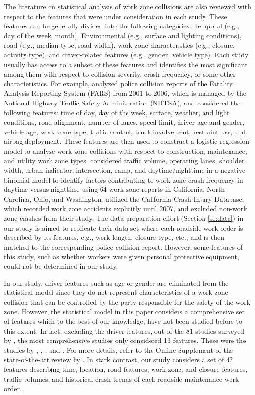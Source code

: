 \documentclass[10pt,a4paper]{article}
\begin{document}
The literature on statistical analysis of work zone collisions are also reviewed with respect to the features that were under consideration in each study. These features can be generally divided into the following categories: Temporal (e.g., day of the week, month), Environmental (e.g., surface and lighting conditions), road (e.g., median type, road width), work zone characteristics (e.g., closure, activity type), and driver-related features (e.g., gender, vehicle type). Each study usually has access to a subset of these features and identifies the most significant among them with respect to collision severity, crash frequency, or some other characteristics. For example, \cite{weng2011analysis} analyzed police collision reports of the Fatality  Analysis  Reporting  System (FARS) from 2001 to 2006, which is managed by the National Highway Traffic Safety Administration (NHTSA), and considered the following features: time of day, day of the week, surface, weather, and light conditions, road alignment, number of lanes, speed limit, driver age and gender, vehicle age, work zone type, traffic control, truck involvement, restraint use, and airbag deployment. These features are then used to construct a logistic regression model to analyze work zone collisions with respect to construction, maintenance, and utility work zone types. \cite{srinivasan2011use} considered traffic volume, operating lanes, shoulder width, urban indicator, intersection, ramp, and daytime/nighttime in a negative binomial model to identify factors contributing to work zone crash frequency in daytime versus nighttime using 64 work zone reports in California, North Carolina, Ohio, and Washington. \cite{wong2011factors} utilized the California Crash Injury Database, which recorded work zone accidents explicitly until 2007, and excluded non-work zone crashes from their study. The data preparation effort (Section \ref{se:data}) in our study is aimed to replicate their data set where each roadside work order is described by its features, e.g., work length, closure type, etc., and is then matched to the corresponding police collision report. However, some features of this study, such as whether workers were given personal protective equipment, could not be determined in our study.

In our study, driver features such as age or gender are eliminated from the statistical model since they do not represent characteristics of a work zone collision that can be controlled by the party responsible for the safety of the work zone. However, the statistical model in this paper considers a comprehensive set of features which to the best of our knowledge, have not been studied before to this extent. In fact, excluding the driver features, out of the 81 studies surveyed by \cite{yang2015work}, the most comprehensive studies only considered 13 features. These were the studies by \cite{li2008comparison}, \cite{li2008development}, \cite{li2009highway}, and \cite{elghamrawy2011optimizing}. For more details, refer to the Online Supplement of the state-of-the-art review by \cite{yang2015work}. In stark contrast, our study considers a set of 42 features describing time, location, road features, work zone, and closure features, traffic volumes, and historical crash trends of each roadside maintenance work order.
\end{document}
